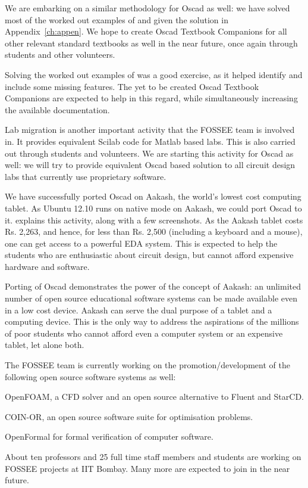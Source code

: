 We are embarking on a similar methodology for Oscad as well: we have
solved most of the worked out examples of \cite{sedra} and given the
solution in Appendix~\ref{ch:appen}.  We hope to create Oscad Textbook
Companions for all other relevant standard textbooks as well in the
near future, once again through students and other volunteers.

Solving the worked out examples of \cite{sedra} was a good exercise,
as it helped identify and
include some missing features.  The yet to be created Oscad Textbook
Companions are expected to help in this regard, while simultaneously
increasing the available documentation.

Lab migration is another important activity that the FOSSEE team is
involved in.  It provides equivalent Scilab code for Matlab based
labs.  This is also carried out through students and volunteers.  We
are starting this activity for Oscad as well: we will try to provide
equivalent Oscad based solution to all circuit design labs that
currently use proprietary software.

We have successfully ported Oscad on Aakash, the world's lowest cost
computing tablet.  As Ubuntu 12.10 runs on native mode on Aakash, we
could port Oscad to it.   explains this activity,
along with a few screenshots.  As the Aakash tablet costs Rs. 2,263,
and hence, for less than Rs. 2,500 (including a keyboard and a mouse),
one can get access to a powerful EDA system.  This is expected to help
the students who are enthusiastic about circuit design, but cannot
afford expensive hardware and software.

Porting of Oscad demonstrates the power of the concept of Aakash: an
unlimited number of open source educational software systems can be
made available even in a low cost device.  Aakash can serve the dual
purpose of a tablet and a computing device.  This is the only way to
address the aspirations of the millions of poor students who cannot
afford even a computer system or an expensive tablet, let alone
both.

The FOSSEE team is currently working on the promotion/development of
the following open source software systems as well: 
\begin{inparaenum}
\item OpenFOAM, a CFD solver and an open source alternative to Fluent
  and StarCD.
\item COIN-OR, an open source software suite for optimisation
  problems. 
\item OpenFormal for formal verification of computer software.  
\end{inparaenum}
About ten professors and 25 full time staff members and students are
working on FOSSEE projects at IIT Bombay.  Many more are expected to
join in the near future.  

